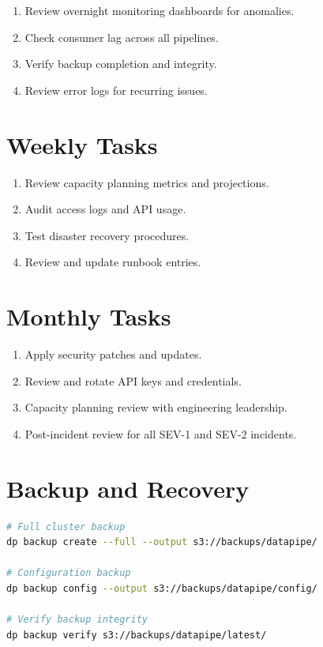 \documentclass[
    language=english,
    doctype=manual,
    institution=none,
    titlestyle=book,
    oneside,
]{omnilatex}
\begin{document}
\begin{enumerate}
    \item Review overnight monitoring dashboards for anomalies.
    \item Check consumer lag across all pipelines.
    \item Verify backup completion and integrity.
    \item Review error logs for recurring issues.
\end{enumerate}

\section{Weekly Tasks}

\begin{enumerate}
    \item Review capacity planning metrics and projections.
    \item Audit access logs and API usage.
    \item Test disaster recovery procedures.
    \item Review and update runbook entries.
\end{enumerate}

\section{Monthly Tasks}

\begin{enumerate}
    \item Apply security patches and updates.
    \item Review and rotate API keys and credentials.
    \item Capacity planning review with engineering leadership.
    \item Post-incident review for all SEV-1 and SEV-2 incidents.
\end{enumerate}

\section{Backup and Recovery}

\begin{lstlisting}[language=bash, caption={Backup commands.}]
# Full cluster backup
dp backup create --full --output s3://backups/datapipe/

# Configuration backup
dp backup config --output s3://backups/datapipe/config/

# Verify backup integrity
dp backup verify s3://backups/datapipe/latest/
\end{lstlisting}
\end{document}

